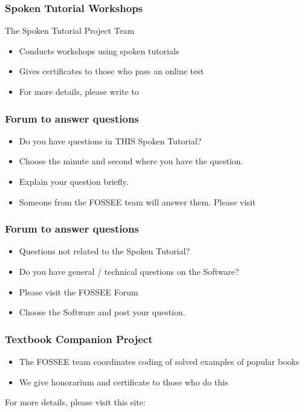 \documentclass[17pt]{beamer}
\begin{document}
\begin{frame}
\frametitle{Spoken Tutorial Workshops}The Spoken Tutorial Project Team 
\begin{itemize}
\item Conducts workshops using spoken tutorials 
\item Gives certificates to those who pass an online test 
\item For more details, please write to \\ 
\end{itemize}
\end{frame}
\begin{frame}
\frametitle{Forum to answer questions}
\begin{itemize}
\item Do you have questions in THIS Spoken Tutorial?
\item Choose the minute and second where you have the question.
\item Explain your question briefly.
\item Someone from the FOSSEE team will answer them. Please visit 
\end{itemize}
\begin{center}
{\color{blue}{http://forums.spoken-tutorial.org/}}
 \end{center} 
\end{frame}
\begin{frame}
\frametitle{Forum to answer questions}
\begin{itemize}
\item Questions not related to the Spoken Tutorial?
\item Do you have general / technical questions on the Software?
\item Please visit the FOSSEE Forum
\begin{center}
{\color{blue}{http://forums.fossee.in/}}
 \end{center}
\item Choose the Software and post your question.
\end{itemize}
\end{frame}
\begin{frame}
\frametitle{Textbook Companion Project}
\begin{itemize}
\item The FOSSEE team coordinates coding of solved examples of popular
  books 
\item We give honorarium and certificate to those who do this
\end{itemize}
For more details, please visit this site:
\begin{center}
{\color{blue}{http://tbc-python.fossee.in/}}
\end{center}
\end{frame}
\end{document}
